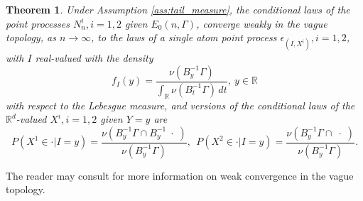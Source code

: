 \documentclass[11pt,reqno]{amsart}
\numberwithin{equation}{section}
\newtheorem{theorem}{Theorem} %
\theoremstyle{definition}
\theoremstyle{remark}
\theoremstyle{definition}
\newcommand{\R}{\mathbb{R}}
\begin{document}
\begin{theorem}\label{thm:ptprocess_longmem}
Under Assumption \ref{ass:tail_measure},  the 
conditional laws of the point processes $N_n^i, i = 1, 2$ given $E_0(n,\Gamma)$, 
  converge weakly in  the vague topology, as $n\to\infty$,   to the
  laws  of a single atom point process $\epsilon_{(I,X^i)}, i = 1, 2$, with $I$
  real-valued with the density
  $$
  f_I(y) = \frac{\nu (B_y^{-1}\Gamma)}{\int_\R \nu (B_t^{-1}\Gamma)\, dt}, \ y\in\R
  $$
 with respect to the Lebesgue measure, and versions of the
 conditional laws of the $\R^d$-valued $X^i, i = 1, 2$  given  $Y=y$ are 
 $$
 P(X^1\in\cdot | I = y) = \frac{\nu (B_y^{-1} \Gamma \cap B_y^{-1} \; \cdot\;)}{\nu(B_y^{-1}
   \Gamma)}, \  \ P(X^2\in\cdot | I = y) = \frac{\nu (B_y^{-1} \Gamma \cap \; \cdot\;)}{\nu(B_y^{-1}  \Gamma)}. 
 $$
\end{theorem}
The reader may consult \cite{resnick:1987}
for more information on weak convergence in the vague topology.  
\end{document}

